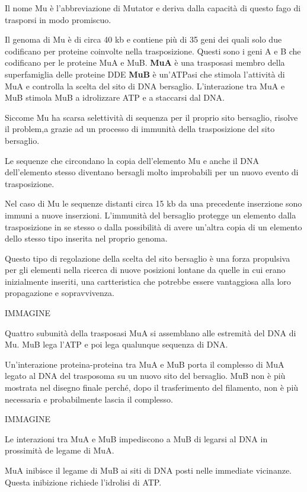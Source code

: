 \documentclass[11pt]{book}
\begin{document}
Il nome Mu è l'abbreviazione di Mutator e deriva dalla capacità di
questo fago di trasporsi in modo promiscuo.

Il genoma di Mu è di circa 40 kb e contiene più di 35 geni dei quali
solo due codificano per proteine coinvolte nella trasposizione. Questi
sono i geni A e B che codificano per le proteine MuA e MuB. \textbf{MuA}
è una trasposasi membro della superfamiglia delle proteine DDE
\textbf{MuB} è un'ATPasi che stimola l'attività di MuA e controlla la
scelta del sito di DNA bersaglio. L'interazione tra MuA e MuB stimola
MuB a idrolizzare ATP e a staccarsi dal DNA.

Siccome Mu ha scarsa selettività di sequenza per il proprio sito
bersaglio, risolve il problem,a grazie ad un processo di immunità della
trasposizione del sito bersaglio.

Le sequenze che circondano la copia dell'elemento Mu e anche il DNA
dell'elemento stesso diventano bersagli molto improbabili per un nuovo
evento di trasposizione.

Nel caso di Mu le sequenze distanti circa 15 kb da una precedente
inserzione sono immuni a nuove inserzioni. L'immunità del bersaglio
protegge un elemento dalla trasposizione in se stesso o dalla
possibilità di avere un'altra copia di un elemento dello stesso tipo
inserita nel proprio genoma.

Questo tipo di regolazione della scelta del sito bersaglio è una forza
propulsiva per gli elementi nella ricerca di nuove posizioni lontane da
quelle in cui erano inizialmente inseriti, una cartteristica che
potrebbe essere vantaggiosa alla loro propagazione e sopravvivenza.

IMMAGINE

Quattro subunità della trasposasi MuA si assemblano alle estremità del
DNA di Mu. MuB lega l'ATP e poi lega qualunque sequenza di DNA.

Un'interazione proteina-proteina tra MuA e MuB porta il complesso di MuA
legato al DNA del trasposoma su un nuovo sito del bersaglio. MuB non è
più mostrata nel disegno finale perché, dopo il trasferimento del
filamento, non è più necessaria e probabilmente lascia il complesso.

IMMAGINE

Le interazioni tra MuA e MuB impediscono a MuB di legarsi al DNA in
prossimità de legame di MuA.

MuA inibisce il legame di MuB ai siti di DNA posti nelle immediate
vicinanze. Questa inibizione richiede l'idrolisi di ATP.
\end{document}
